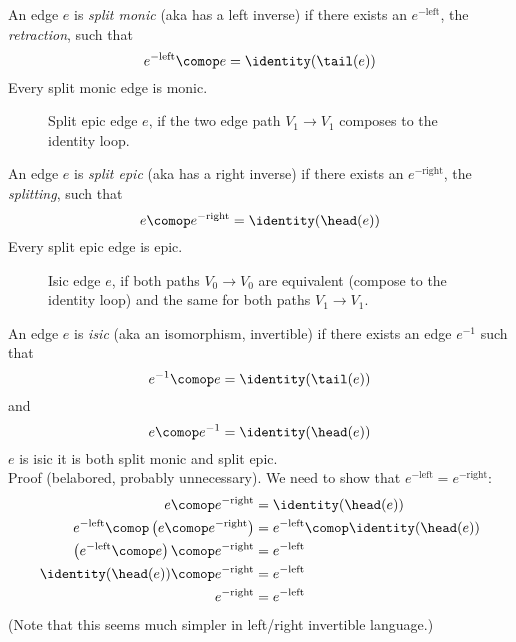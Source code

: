 \documentclass[11pt]{book}
\begin{document}
An edge $e$ is \textit{split monic} (aka has a left inverse)
if there exists an $e^{-\text{left}}$, the \textit{retraction},
such that
\[
e^{-\text{left}} \comop e = \identity(\tail(e))
\]
Every split monic edge is monic.

\begin{figure}
\centering
{}
\caption{Split epic edge $e$, if the two edge path
$V_1 \longrightarrow V_1$
composes to the identity loop.}
\label{fig:split_monic}
\end{figure}

An edge $e$ is \textit{split epic} (aka has a right inverse)
if there exists an $e^{-\text{right}}$, the \textit{splitting}, 
such that
\[
e \comop e^{-\text{right}} = \identity(\head(e))
\]
Every split epic edge is epic.

\begin{figure}
\centering
{}
\caption{Isic edge $e$, if both paths $V_0 \longrightarrow V_0$
are equivalent (compose to the identity loop) and the 
same for both paths $V_1 \longrightarrow V_1$.}
\label{fig:split_epic}
\end{figure}

An edge $e$ is \textit{isic} (aka an isomorphism, invertible)
if there exists an edge $e^{-1}$ such that
\[
e^{-1} \comop e = \identity(\tail(e))
\]
and
\[
e \comop e^{-1} = \identity(\head(e))
\]
$e$ is isic \liff it is both split monic and split epic.\\
Proof (belabored, probably unnecessary).
We need to show that $e^{-\text{left}} = e^{-\text{right}}$:
\begin{align*}
e \comop e^{-\text{right}} 
& = 
\identity(\head(e)) 
\\
e^{-\text{left}} \comop \left( e \comop e^{-\text{right}} \right)
& = 
e^{-\text{left}} \comop \identity(\head(e)) 
\\
\left( e^{-\text{left}} \comop e \right) \comop e^{-\text{right}} 
& = 
e^{-\text{left}}
\\
\identity(\head(e)) \comop e^{-\text{right}} 
& = 
e^{-\text{left}} 
\\
e^{-\text{right}} 
& = 
e^{-\text{left}} 
\end{align*}
(Note that this seems much simpler in left/right invertible language.)
\end{document}
